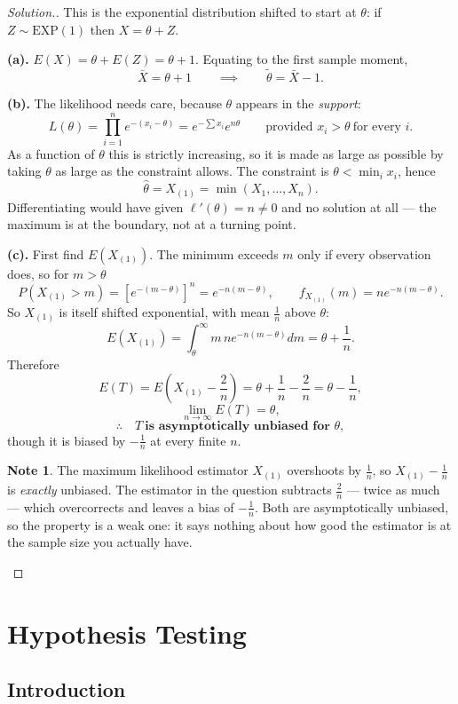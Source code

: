 \documentclass[12pt,a4paper]{report}
\theoremstyle{definition}
\newtheorem{note}[thm]{Note}
\theoremstyle{plain}
\newenvironment{solution}
  {\renewcommand{\qedsymbol}{}\begin{proof}[\textit{Solution}.]}
  {\end{proof}}
\begin{document}
\begin{solution}
This is the exponential distribution shifted to start at $\theta$: if
$Z\sim\text{EXP}(1)$ then $X=\theta+Z$.

\textbf{(a).} $E(X)=\theta+E(Z)=\theta+1$. Equating to the first sample moment,
\[\bar X=\theta+1\qquad\implies\qquad\tilde\theta=\bar X-1.\]

\textbf{(b).} The likelihood needs care, because $\theta$ appears in the
\emph{support}:
\[L(\theta)=\prod_{i=1}^ne^{-(x_i-\theta)}=e^{-\sum x_i}e^{n\theta}
\qquad\text{provided }x_i>\theta\ \text{for every }i.\]
As a function of $\theta$ this is strictly increasing, so it is made as large as
possible by taking $\theta$ as large as the constraint allows. The constraint is
$\theta<\min_ix_i$, hence
\[\hat\theta=X_{(1)}=\min\left(X_1,\ldots,X_n\right).\]
Differentiating would have given $\ell'(\theta)=n\neq0$ and no solution at all ---
the maximum is at the boundary, not at a turning point.

\textbf{(c).} First find $E\left(X_{(1)}\right)$. The minimum exceeds $m$ only if
every observation does, so for $m>\theta$
\[P\left(X_{(1)}>m\right)=\left[e^{-(m-\theta)}\right]^n=e^{-n(m-\theta)},
\qquad f_{X_{(1)}}(m)=ne^{-n(m-\theta)}.\]
So $X_{(1)}$ is itself shifted exponential, with mean $\frac1n$ above $\theta$:
\[E\left(X_{(1)}\right)=\int_\theta^\infty m\,ne^{-n(m-\theta)}dm
=\theta+\frac{1}{n}.\]
Therefore
\[E(T)=E\left(X_{(1)}-\frac{2}{n}\right)=\theta+\frac{1}{n}-\frac{2}{n}
=\theta-\frac{1}{n},\]
\[\lim_{n\to\infty}E(T)=\theta,\]
\[\therefore\quad T\ \textbf{is asymptotically unbiased for }\theta,\]
though it is biased by $-\frac1n$ at every finite $n$.

\begin{note}
The maximum likelihood estimator $X_{(1)}$ overshoots by $\frac1n$, so
$X_{(1)}-\frac1n$ is \emph{exactly} unbiased. The estimator in the question
subtracts $\frac2n$ — twice as much — which overcorrects and leaves a bias of
$-\frac1n$. Both are asymptotically unbiased, so the property is a weak one: it
says nothing about how good the estimator is at the sample size you actually
have.
\end{note}
\end{solution}

\chapter{Hypothesis Testing}

\section{Introduction}
\end{document}
